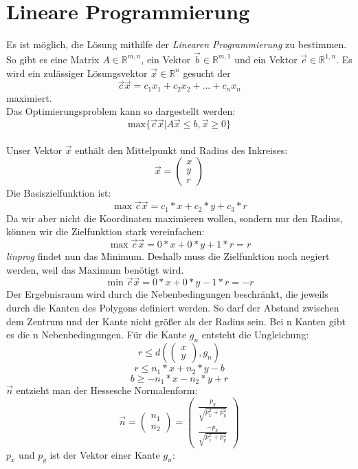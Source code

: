 \documentclass[conference]{IEEEtran}
\begin{document}
	\section{Lineare Programmierung}
	Es ist möglich, die Lösung mithilfe der \textit{Linearen Programmierung} zu bestimmen. So gibt es eine Matrix $A \in \mathbb{R}^{m,n}$, ein Vektor $\vec{b} \in \mathbb{R}^{m,1}$ und ein Vektor $\vec{c} \in \mathbb{R}^{1,n}$.	Es wird ein zulässiger Lösungsvektor $\vec{x} \in \mathbb{R}^{n}$ gesucht der
	\[ \vec{c}\vec{x} = c_1x_1 + c_2x_2+ ... + c_nx_n \]
	maximiert.\\
	Das Optimierungsproblem kann so dargestellt werden:
	\[ \text{max}\{\vec{c}\vec{x} | A\vec{x} \leq b, \vec{x} \geq 0\} \]
	\cite{b2}\\
	Unser Vektor $\vec{x}$ enthält den Mittelpunkt und Radius des Inkreises:
	\[ \vec{x} = \left(\begin{array}{c}x\\y\\r\end{array}\right) \]
	Die Basiszielfunktion ist:
	\[\max \vec{c}\vec{x} = c_1*x+c_2*y+c_3*r \]
	Da wir aber nicht die Koordinaten maximieren wollen, sondern nur den Radius, können wir die Zielfunktion stark vereinfachen:
	\[ \max \vec{c}\vec{x} = 0*x+0*y+1*r = r \]
	\textit{linprog} findet nun das Minimum. Deshalb muss die Zielfunktion noch negiert werden, weil das Maximum benötigt wird.\\
	\[ \min \vec{c}\vec{x} = 0*x+0*y-1*r = -r \]
	Der Ergebnisraum wird durch die Nebenbedingungen beschränkt, die jeweils durch die Kanten des Polygons definiert werden. So darf der Abstand zwischen dem Zentrum und der Kante nicht größer als der Radius sein. Bei n Kanten gibt es die n Nebenbedingungen. Für die Kante $g_n$ entsteht die Ungleichung:
	\[  r \leq d(\left(\begin{array}{c}x\\y\end{array}\right), g_n) \]
	\[  r \leq n_1 * x + n_2 * y - b \]
	\[  b \geq -n_1 * x - n_2 * y + r \]
	$\vec{n}$ entzieht man der Hessesche Normalenform:
	\[ \vec{n} =  \left(\begin{array}{c}n_1\\n_2\end{array}\right) = \left(\begin{array}{c}\frac{p_y}{\sqrt{p_x^2+p_y^2}}\\\frac{-p_x}{\sqrt{p_x^2+p_y^2}}\end{array}\right) \]
	$p_x$ und $p_y$ ist der Vektor einer Kante $g_n$:\\
\end{document}
